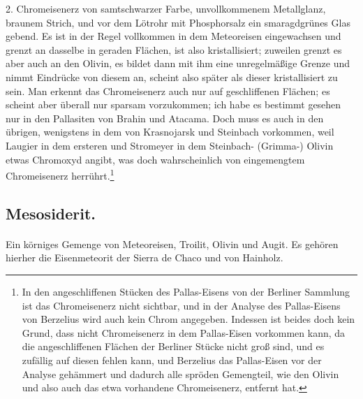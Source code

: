 \documentclass[a4paper, 11pt, oneside]{article}
\begin{document}
2. Chromeisenerz von samtschwarzer Farbe, unvollkommenem Metallglanz, braunem Strich, und vor dem Lötrohr mit Phosphorsalz ein smaragdgrünes Glas gebend. Es ist in der Regel vollkommen in dem Meteoreisen eingewachsen und grenzt an dasselbe in geraden Flächen, ist also kristallisiert; zuweilen grenzt es aber auch an den Olivin, es bildet dann mit ihm eine unregelmäßige Grenze und nimmt Eindrücke von diesem an, scheint also später als dieser kristallisiert zu sein. Man erkennt das Chromeisenerz auch nur auf geschliffenen Flächen; es scheint aber überall nur sparsam vorzukommen; ich habe es bestimmt gesehen nur in den Pallasiten von Brahin und Atacama. Doch muss es auch in den übrigen, wenigstens in dem von Krasnojarsk und Steinbach vorkommen, weil Laugier in dem ersteren und Stromeyer in dem Steinbach- (Grimma-) Olivin etwas Chromoxyd angibt, was doch wahrscheinlich von eingemengtem Chromeisenerz herrührt.\footnote{In den angeschliffenen Stücken des Pallas-Eisens von der Berliner Sammlung ist das Chromeisenerz nicht sichtbar, und in der Analyse des Pallas-Eisens von Berzelius wird auch kein Chrom angegeben. Indessen ist beides doch kein Grund, dass nicht Chromeisenerz in dem Pallas-Eisen vorkommen kann, da die angeschliffenen Flächen der Berliner Stücke nicht groß sind, und es zufällig auf diesen fehlen kann, und Berzelius das Pallas-Eisen vor der Analyse gehämmert und dadurch alle spröden Gemengteil, wie den Olivin und also auch das etwa vorhandene Chromeisenerz, entfernt hat.}
\subsection{Mesosiderit.}
\paragraph{}
Ein körniges Gemenge von Meteoreisen, Troilit, Olivin und Augit. Es gehören hierher die Eisenmeteorit der Sierra de Chaco und von Hainholz.
\end{document}
